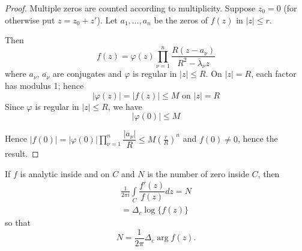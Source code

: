 \begin{proof}
Multiple zeros are counted according to multiplicity. Suppose $z_0=0$
(for otherwise put $z=z_0+z'$). Let $a_1, \ldots, a_n$ be the zeros of
$f(z)$ in $|z|\leq r$. 

Then 
$$
f(z) = \varphi(z) \prod\limits^n_{\nu=1}
\dfrac{R(z-a_\nu)}{R^2 - \overline{\lambda}_\nu z}
$$
 where $a_\nu$, $\overline{a_\nu}$ are conjugates and $\varphi$ is regular in $|z|
\leq R$. On $|z| = R$, each factor has modulus 1; hence
$$
|\varphi(z)| = |f(z)| \leq M \text{ on }|z|=R
$$
Since $\varphi$ is regular in $|z| \leq R$, we have
$$
|\varphi (0)| \leq M
$$

Hence \quad $|f(0)| = | \varphi(0)| \prod\limits^n_{\nu=1}
\dfrac{|a_\nu|}{R} \leq M \left(\frac{r}{R}\right)^n$ and $f(0) \neq
0$, hence the result.
\end{proof}

\begin{theorem*}
If $f$ is analytic inside and on $C$ and $N$ is the number of zero
inside $C$, then
\begin{gather*}
\frac{1}{2\pi i} \int\limits_C \dfrac{f'(z)}{f(z)} dz = N\\
= \Delta_c \log \{f(z)\}
\end{gather*}
so that
$$
N = \frac{1}{2\pi} \Delta_c \arg f(z).
$$
\end{theorem*}
